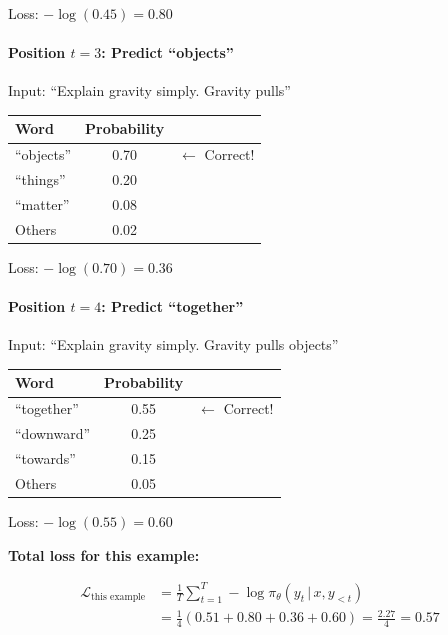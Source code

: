 \begin{chapterenv}
Loss: $-\log(0.45) = 0.80$

\paragraph{Position $t=3$: Predict ``objects''}

Input: ``Explain gravity simply. Gravity pulls''

\begin{center}
\begin{tabular}{lcc}
\toprule
\textbf{Word} & \textbf{Probability} & \\
\midrule
``objects'' & 0.70 & $\leftarrow$ Correct! \\
``things'' & 0.20 & \\
``matter'' & 0.08 & \\
Others & 0.02 & \\
\bottomrule
\end{tabular}
\end{center}

Loss: $-\log(0.70) = 0.36$

\paragraph{Position $t=4$: Predict ``together''}

Input: ``Explain gravity simply. Gravity pulls objects''

\begin{center}
\begin{tabular}{lcc}
\toprule
\textbf{Word} & \textbf{Probability} & \\
\midrule
``together'' & 0.55 & $\leftarrow$ Correct! \\
``downward'' & 0.25 & \\
``towards'' & 0.15 & \\
Others & 0.05 & \\
\bottomrule
\end{tabular}
\end{center}

Loss: $-\log(0.55) = 0.60$

\textbf{Total loss for this example:}

\begin{align*}
\mathcal{L}_{\text{this example}} &= \frac{1}{T}\sum_{t=1}^T -\log \pi_\theta(y_t \,|\, x, y_{<t}) \\
&= \frac{1}{4}(0.51 + 0.80 + 0.36 + 0.60) = \frac{2.27}{4} = 0.57
\end{align*}


\end{chapterenv}
